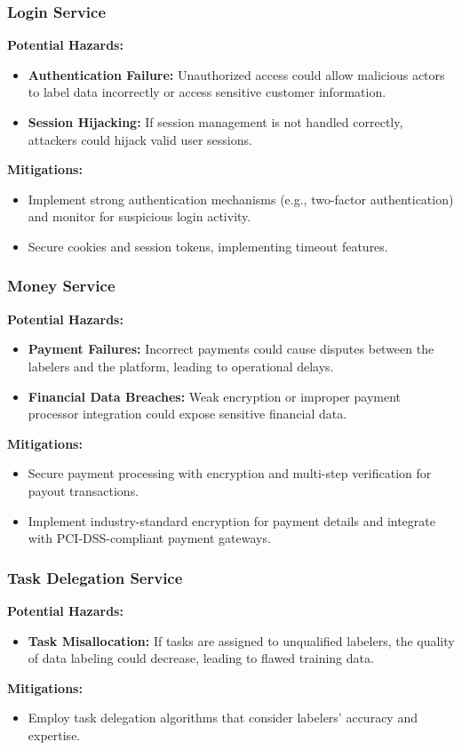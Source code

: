 \documentclass{article}
\begin{document}
\subsubsection{Login Service}
\textbf{Potential Hazards:}
\begin{itemize}
    \item \textbf{Authentication Failure:} Unauthorized access could allow malicious actors to label data incorrectly or access sensitive customer information.
    \item \textbf{Session Hijacking:} If session management is not handled correctly, attackers could hijack valid user sessions.
\end{itemize}
\textbf{Mitigations:}
\begin{itemize}
    \item Implement strong authentication mechanisms (e.g., two-factor authentication) and monitor for suspicious login activity.
    \item Secure cookies and session tokens, implementing timeout features.
\end{itemize}

\subsubsection{Money Service}
\textbf{Potential Hazards:}
\begin{itemize}
    \item \textbf{Payment Failures:} Incorrect payments could cause disputes between the labelers and the platform, leading to operational delays.
    \item \textbf{Financial Data Breaches:} Weak encryption or improper payment processor integration could expose sensitive financial data.
\end{itemize}
\textbf{Mitigations:}
\begin{itemize}
    \item Secure payment processing with encryption and multi-step verification for payout transactions.
    \item Implement industry-standard encryption for payment details and integrate with PCI-DSS-compliant payment gateways.
\end{itemize}

\subsubsection{Task Delegation Service}
\textbf{Potential Hazards:}
\begin{itemize}
    \item \textbf{Task Misallocation:} If tasks are assigned to unqualified labelers, the quality of data labeling could decrease, leading to flawed training data.
\end{itemize}
\textbf{Mitigations:}
\begin{itemize}
    \item Employ task delegation algorithms that consider labelers’ accuracy and expertise.
\end{itemize}
\end{document}
